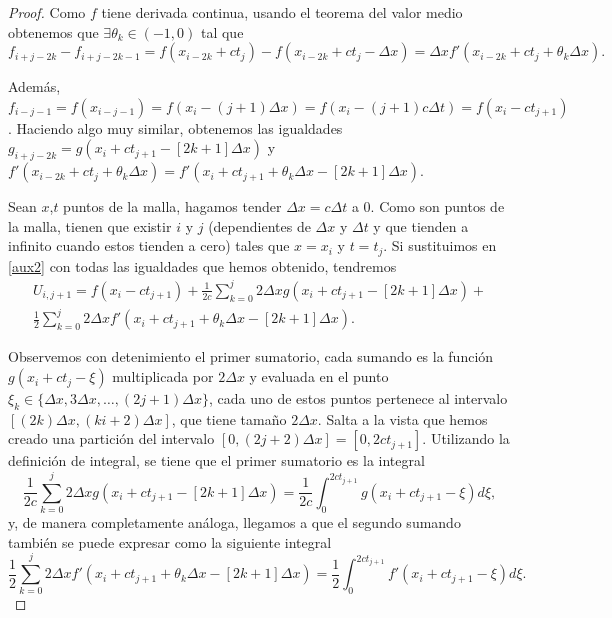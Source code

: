 \begin{proof}
	Como $f$ tiene derivada continua, usando el teorema del valor medio obtenemos que $\exists\theta_k\in(-1,0)$ tal que
	\begin{equation}
		f_{i+j-2k}-f_{i+j-2k-1} = f(x_{i-2k}+ct_j) - f(x_{i-2k}+ct_{j}-\Delta x) = \Delta xf'(x_{i-2k}+ct_j+\theta_k\Delta x).
	\end{equation} 

	Además, $f_{i-j-1}=f(x_{i-j-1})=f(x_i-(j+1)\Delta x)=f(x_i -(j+1)c\Delta t)=f(x_i-ct_{j+1})$. Haciendo algo muy similar, obtenemos las igualdades $g_{i+j-2k}=g(x_i+ct_{j+1}-[2k+1]\Delta x)$ y $f'(x_{i-2k}+ct_j+\theta_k\Delta x)=f'(x_i+ct_{j+1}+\theta_k\Delta x - [2k+1]\Delta x)$.
	
	Sean $x$,$t$ puntos de la malla, hagamos tender $\Delta x=c\Delta t$ a 0. Como son puntos de la malla, tienen que existir $i$ y $j$ (dependientes de $\Delta x$ y $\Delta t$ y que tienden a infinito cuando estos tienden a cero) tales que $x=x_i$ y $t=t_j$.
	Si sustituimos en \eqref{aux2} con todas las igualdades que hemos obtenido, tendremos
	\begin{multline}
		U_{i,j+1} = f(x_i-ct_{j+1}) + \frac{1}{2c}\sum_{k=0}^{j}2\Delta xg(x_i+ct_{j+1}-[2k+1]\Delta x) + \\ \frac{1}{2}\sum_{k=0}^{j}2\Delta xf'(x_i+ct_{j+1} +\theta_k\Delta x - [2k+1]\Delta x).
	\end{multline}
	
	Observemos con detenimiento el primer sumatorio, cada sumando es la función $g(x_i+ct_j - \xi)$ multiplicada por $2\Delta x$ y evaluada en el punto $\xi_k\in \{\Delta x, 3\Delta x,\dots, (2j+1)\Delta x\}$, cada uno de estos puntos pertenece al intervalo $[(2k)\Delta x, (ki+2)\Delta x]$, que tiene tamaño $2\Delta x$. Salta a la vista que hemos creado una partición del intervalo $[0,(2j+2)\Delta x] = [0,2ct_{j+1}]$. Utilizando la definición de integral, se tiene que el primer sumatorio es la integral
	\begin{equation}
		\frac{1}{2c}\sum_{k=0}^{j}2\Delta xg(x_i+ct_{j+1}-[2k+1]\Delta x) = \frac{1}{2c}\int_{0}^{2ct_{j+1}}g(x_i+ct_{j+1}-\xi)d\xi,
	\end{equation}
	y, de manera completamente análoga, llegamos a que el segundo sumando también se puede expresar como la siguiente integral
	\begin{equation}
		\frac{1}{2}\sum_{k=0}^{j}2\Delta xf'(x_i+ct_{j+1} +\theta_k\Delta x - [2k+1]\Delta x) = \frac{1}{2}\int_{0}^{2ct_{j+1}} f'(x_i+ct_{j+1}-\xi)d\xi.
	\end{equation}
	

\end{proof}

